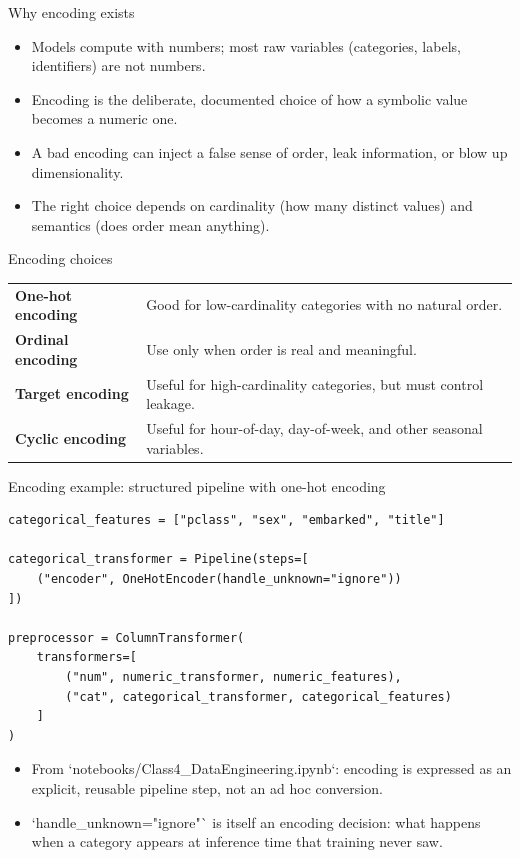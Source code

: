 \begin{frame}{Why encoding exists}
\begin{itemize}
\item Models compute with numbers; most raw variables (categories, labels, identifiers) are not numbers.
\item Encoding is the deliberate, documented choice of how a symbolic value becomes a numeric one.
\item A bad encoding can inject a false sense of order, leak information, or blow up dimensionality.
\item The right choice depends on cardinality (how many distinct values) and semantics (does order mean anything).
\end{itemize}
\coursefooter
\end{frame}

\begin{frame}{Encoding choices}
\begin{tabularx}{\textwidth}{>{\bfseries}l X}
One-hot encoding & Good for low-cardinality categories with no natural order. \\
Ordinal encoding & Use only when order is real and meaningful. \\
Target encoding & Useful for high-cardinality categories, but must control leakage. \\
Cyclic encoding & Useful for hour-of-day, day-of-week, and other seasonal variables. \\
\end{tabularx}
\coursefooter
\end{frame}

\begin{frame}[fragile]{Encoding example: structured pipeline with one-hot encoding}
\begin{lstlisting}[style=coursepython]
categorical_features = ["pclass", "sex", "embarked", "title"]

categorical_transformer = Pipeline(steps=[
    ("encoder", OneHotEncoder(handle_unknown="ignore"))
])

preprocessor = ColumnTransformer(
    transformers=[
        ("num", numeric_transformer, numeric_features),
        ("cat", categorical_transformer, categorical_features)
    ]
)
\end{lstlisting}
\begin{itemize}
\item From `notebooks/Class4_DataEngineering.ipynb`: encoding is expressed as an explicit, reusable pipeline step, not an ad hoc conversion.
\item `handle_unknown="ignore"` is itself an encoding decision: what happens when a category appears at inference time that training never saw.
\end{itemize}
\coursefooter
\end{frame}

